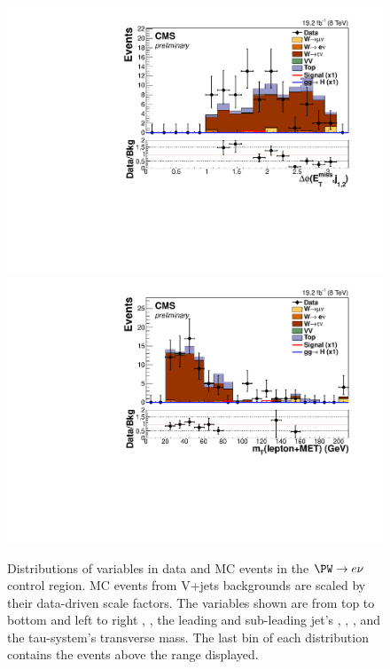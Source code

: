 \begin{figure}
  \includegraphics[width=.65\largefigwidth]{plots/parked/HIG-14-038-figs/output_sigreg/taunu_jetmetnomu_mindphi.pdf}
  \includegraphics[width=.65\largefigwidth]{plots/parked/HIG-14-038-figs/output_sigreg/taunu_lep_mt.pdf}
  \caption{Distributions of variables in data and \ac{MC} events in the $\PW\rightarrow e\nu$ control region. \ac{MC} events from V+jets backgrounds are scaled by their data-driven scale factors. The variables shown are from top to bottom and left to right \detajj, \Mjj, the leading and sub-leading jet's \pt, \METnoMU, \METsig, \jetmetdphileading and the tau-\MET system's transverse mass. The last bin of each distribution contains the events above the range displayed.}
  \label{fig:parkedwtaunu}
\end{figure}

